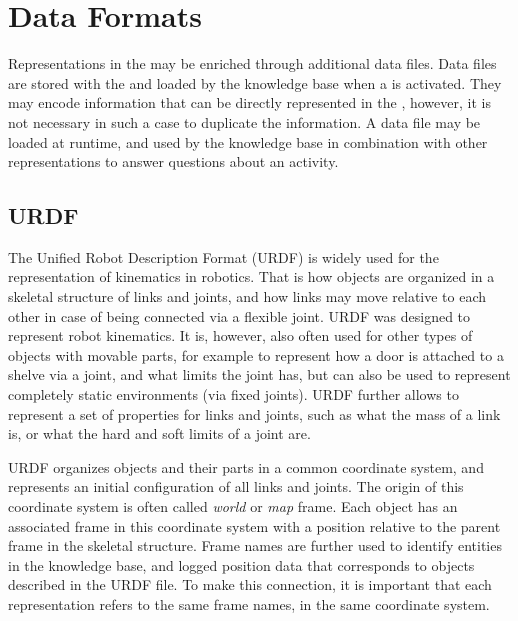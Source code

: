 \section{Data Formats}
\label{sec:background:formats}

Representations in the \neembak may be enriched through additional data files.
Data files are stored with the \neembak and loaded by the \ease knowledge base when a \neem is activated.
They may encode information that can be directly represented in the \neem, however, it is not necessary in such a case to duplicate the information.
A data file may be loaded at runtime, and used by the knowledge base in combination with other representations to answer questions about an activity.

\subsection{URDF}
\label{sec:background:urdf}

The Unified Robot Description Format (URDF) is widely used for the representation of kinematics in robotics. That is how objects are organized in a skeletal structure of links and joints, and how links may move relative to each other in case of being connected via a flexible joint.
URDF was designed to represent robot kinematics.
It is, however, also often used for other types of objects with movable parts, for example to represent how a door is attached to a shelve via a joint, and what limits the joint has, but can also be used to represent completely static environments (via fixed joints).
URDF further allows to represent a set of properties for links and joints, such as what the mass of a link is, or what the hard and soft limits of a joint are.

URDF organizes objects and their parts in a common coordinate system, and represents an initial configuration of all links and joints.
The origin of this coordinate system is often called \emph{world} or \emph{map} frame.
Each object has an associated frame in this coordinate system with a position relative to the parent frame in the skeletal structure.
Frame names are further used to identify entities in the knowledge base, and logged position data that corresponds to objects described in the URDF file.
To make this connection, it is important that each representation refers to the same frame names, in the same coordinate system.

